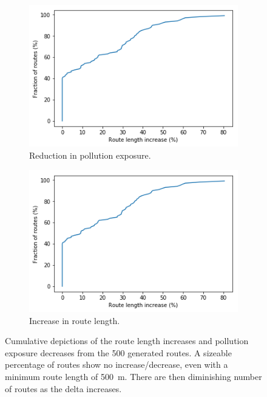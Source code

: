 \documentclass[11pt]{report}
\begin{document}
\begin{figure}[!tb]
    \centering
    \begin{minipage}{1\linewidth}
            \begin{subfigure}[t]{.5\linewidth}
                \includegraphics[width=\textwidth]{images/pollution_reductions}
                \caption{Reduction in pollution exposure.}
                \label{fig:pollution_reductions}
            \end{subfigure}
            \begin{subfigure}[t]{.5\linewidth}
            	\includegraphics[width=\textwidth]{images/length_increases}
            	\caption{Increase in route length.}
            	\label{fig:length_increases}
	   \end{subfigure}
    \end{minipage}
    \caption{Cumulative depictions of the route length increases and pollution exposure decreases from the 500 generated routes. A sizeable percentage of routes show no increase/decrease, even with a minimum route length of 500~m. There are then diminishing number of routes as the delta increases.}
    \label{fig:cumulatives}
\end{figure}
\end{document}
